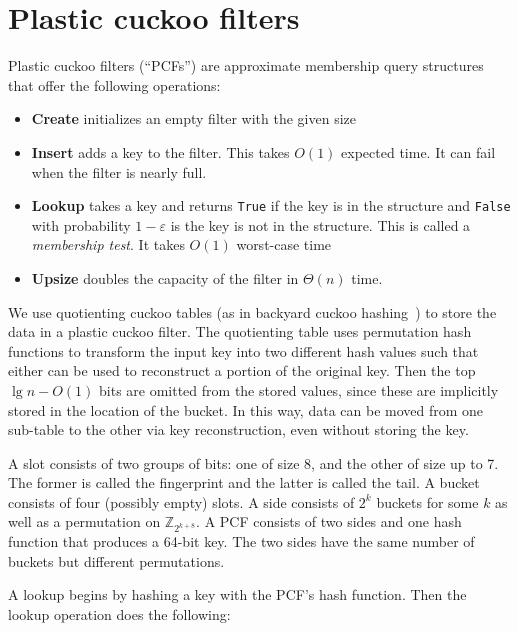 \documentclass[letterpaper, 11pt]{article}
\newcommand{\ints}{\mathbb{Z}}
\begin{document}
\section{Plastic cuckoo filters}
\label{pcf}
Plastic cuckoo filters (``PCFs'') are approximate membership query structures that offer the following operations:

\begin{itemize}
\item {\bf Create} initializes an empty filter with the given size
\item {\bf Insert} adds a key to the filter.
  This takes $O(1)$ expected time.
  It can fail when the filter is nearly full.
\item {\bf Lookup} takes a key and returns \verb|True| if the key is in the structure and \verb|False| with probability $1-\varepsilon$ is the key is not in the structure.
  This is called a {\em membership test}.
  It takes $O(1)$ worst-case time
\item {\bf Upsize} doubles the capacity of the filter in $\Theta(n)$ time.
\end{itemize}

We use quotienting cuckoo tables (as in backyard cuckoo hashing~\cite{backyard}) to store the data in a plastic cuckoo filter.
The quotienting table uses permutation hash functions to transform the input key into two different hash values such that either can be used to reconstruct a portion of the original key.
Then the top $\lg n - O(1)$ bits are omitted from the stored values, since these are implicitly stored in the location of the bucket.
In this way, data can be moved from one sub-table to the other via key reconstruction, even without storing the key.

A slot consists of two groups of bits: one of size 8, and the other of size up to 7.
The former is called the fingerprint and the latter is called the tail.
A bucket consists of four (possibly empty) slots.
A side consists of $2^k$ buckets for some $k$ as well as a permutation on $\ints_{2^{k+8}}$.
A PCF consists of two sides and one hash function that produces a 64-bit key.
The two sides have the same number of buckets but different permutations.

A lookup begins by hashing a key with the PCF's hash function.
Then the lookup operation does the following:
\end{document}
